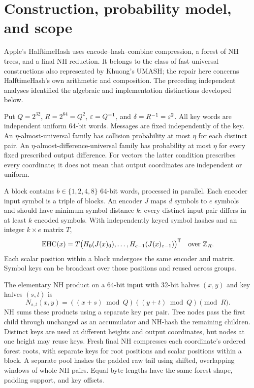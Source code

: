\section{Construction, probability model, and scope}\label{sec:construction}
Apple's HalftimeHash\cite{apple} uses encode--hash--combine compression, a forest of NH trees, and a final NH reduction. It belongs to the class of fast universal constructions also represented by Khuong's UMASH\cite{khuong}; the repair here concerns HalftimeHash's own arithmetic and composition. The preceding independent analyses identified the algebraic and implementation distinctions developed below\cite{audit,proof,second,fourth}.

Put $Q=2^{32}$, $R=2^{64}=Q^2$, $\varepsilon=Q^{-1}$, and $\delta=R^{-1}=\varepsilon^2$. All key words are independent uniform 64-bit words. Messages are fixed independently of the key. An $\eta$-almost-universal family has collision probability at most $\eta$ for each distinct pair. An $\eta$-almost-difference-universal family has probability at most $\eta$ for every fixed prescribed output difference. For vectors the latter condition prescribes every coordinate; it does not mean that output coordinates are independent or uniform.

A block contains $b\in\{1,2,4,8\}$ 64-bit words, processed in parallel. Each encoder input symbol is a triple of blocks. An encoder $J$ maps $d$ symbols to $e$ symbols and should have minimum symbol distance $k$: every distinct input pair differs in at least $k$ encoded symbols. With independently keyed symbol hashes and an integer $k\times e$ matrix $T$,
\[
 \operatorname{EHC}(x)=T\bigl(H_0(J(x)_0),\ldots,H_{e-1}(J(x)_{e-1})\bigr)^{\mathsf T}
 \quad\text{over }\mathbb Z_R.
\]
Each scalar position within a block undergoes the same encoder and matrix. Symbol keys can be broadcast over those positions and reused across groups.

The elementary NH product on a 64-bit input with 32-bit halves $(x,y)$ and key halves $(s,t)$ is
\begin{equation}\label{eq:nh}
 N_{s,t}(x,y)=((x+s)\bmod Q)((y+t)\bmod Q)\pmod R.
\end{equation}
NH sums these products using a separate key per pair. Tree nodes pass the first child through unchanged as an accumulator and NH-hash the remaining children. Distinct keys are used at different heights and output coordinates, but nodes at one height may reuse keys. Fresh final NH compresses each coordinate's ordered forest roots, with separate keys for root positions and scalar positions within a block. A separate pool hashes the padded raw tail using shifted, overlapping windows of whole NH pairs. Equal byte lengths have the same forest shape, padding support, and key offsets.

